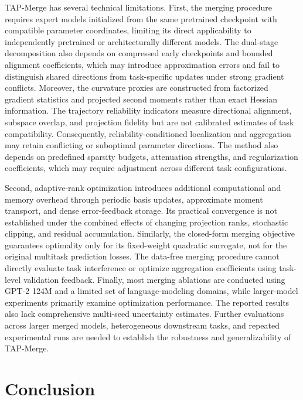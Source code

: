 \documentclass[fleqn,10pt]{wlscirep}
\begin{document}
TAP-Merge has several technical limitations. First, the merging procedure requires expert models initialized from the same pretrained checkpoint with compatible parameter coordinates, limiting its direct applicability to independently pretrained or architecturally different models. The dual-stage decomposition also depends on compressed early checkpoints and bounded alignment coefficients, which may introduce approximation errors and fail to distinguish shared directions from task-specific updates under strong gradient conflicts. Moreover, the curvature proxies are constructed from factorized gradient statistics and projected second moments rather than exact Hessian information. The trajectory reliability indicators measure directional alignment, subspace overlap, and projection fidelity but are not calibrated estimates of task compatibility. Consequently, reliability-conditioned localization and aggregation may retain conflicting or suboptimal parameter directions. The method also depends on predefined sparsity budgets, attenuation strengths, and regularization coefficients, which may require adjustment across different task configurations.

Second, adaptive-rank optimization introduces additional computational and memory overhead through periodic basis updates, approximate moment transport, and dense error-feedback storage. Its practical convergence is not established under the combined effects of changing projection ranks, stochastic clipping, and residual accumulation. Similarly, the closed-form merging objective guarantees optimality only for its fixed-weight quadratic surrogate, not for the original multitask prediction losses. The data-free merging procedure cannot directly evaluate task interference or optimize aggregation coefficients using task-level validation feedback. Finally, most merging ablations are conducted using GPT-2 124M and a limited set of language-modeling domains, while larger-model experiments primarily examine optimization performance. The reported results also lack comprehensive multi-seed uncertainty estimates. Further evaluations across larger merged models, heterogeneous downstream tasks, and repeated experimental runs are needed to establish the robustness and generalizability of TAP-Merge.



\section{Conclusion}
\label{sec:conclusion}
\end{document}
